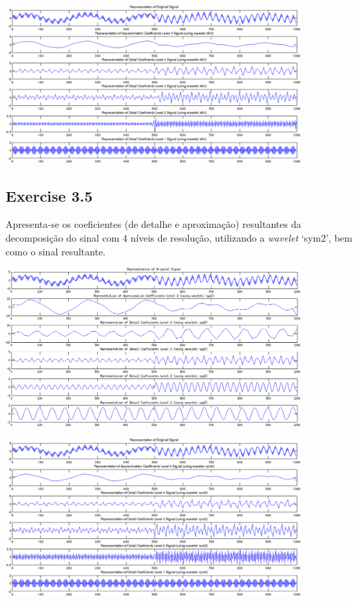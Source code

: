 \documentclass[a4paper]{article}
\begin{document}
\begin{center}
	\includegraphics[width=0.85\textwidth]{images/ex_3_4_sign.png}
\end{center}

\subsection{Exercise 3.5}
\indent \indent Apresenta-se os coeficientes (de detalhe e aproximação) resultantes da decomposição do sinal com 4 níveis de resolução, utilizando a \emph{wavelet} `sym2', bem como o sinal resultante.
\begin{center}
	\includegraphics[width=0.85\textwidth]{images/ex_3_5_coeffs.png}
\end{center}

\begin{center}
	\includegraphics[width=0.85\textwidth]{images/ex_3_5_sign.png}
\end{center}
\end{document}
